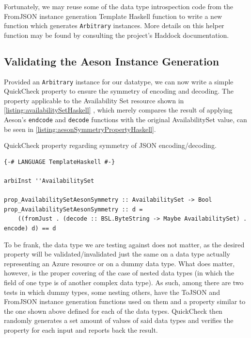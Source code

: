 \documentclass[11pt]{report}
\begin{document}
Fortunately, we may reuse some of the data type introspection code from the
FromJSON instance generation Template Haskell function to write a new function
which generates \texttt{Arbitrary} instances. More details on this helper
function may be found by consulting the project's Haddock documentation.

\subsection{Validating the Aeson Instance Generation}

Provided an \texttt{Arbitrary} instance for our datatype, we can now write a
simple QuickCheck property to ensure the symmetry of encoding and decoding. The
property applicable to the Availability Set resource shown in
\autoref{listing:availabilitySetHaskell} , which merely compares the result
of applying Aeson's \texttt{endcode} and \texttt{decode} functions with the
original AvailabilitySet value, can be seen in
\autoref{listing:aesonSymmetryPropertyHaskell}.

\begin{listing}[H]
\label{listing:aesonSymmetryPropertyHaskell}
\caption{QuickCheck property regarding symmetry of JSON encoding/decoding.}
\begin{verbatim}
{-# LANGUAGE TemplateHaskell #-}

arbiInst ''AvailabilitySet

prop_AvailabilitySetAesonSymmetry :: AvailabilitySet -> Bool
prop_AvailabilitySetAesonSymmetry :: d =
    ((fromJust . (decode :: BSL.ByteString -> Maybe AvailabilitySet) . encode) d) == d
\end{verbatim}
\end{listing}

To be frank, the data type we are testing against does not matter, as the
desired property will be validated/invalidated just the same on a data type
actually representing an Azure resource or on a dummy data type. What does
matter, however, is the proper covering of the case of nested data types (in
which the field of one type is of another complex data type). As such, among
there are two tests in which dummy types, some nesting others, have
the ToJSON and FromJSON instance generation functions used on them and a
property similar to the one shown above defined for each of the data types.
QuickCheck then randomly generates a set amount of values of said data types
and verifies the property for each input and reports back the result.
\end{document}
